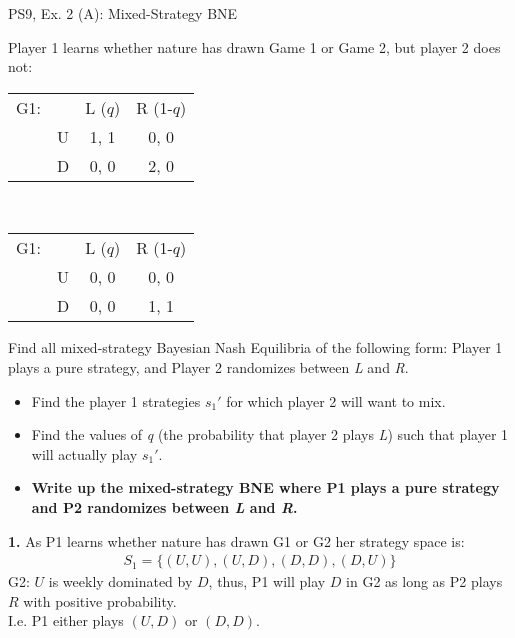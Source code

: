 \begin{frame}{PS9, Ex. 2 (A): Mixed-Strategy BNE}
    \begin{multicols}{2}
      Player 1 learns whether nature has drawn Game 1 or Game 2, but player 2 does not:
      \begin{table}
        \begin{tabular}{ll|c|c|}
          \multicolumn{1}{c}{G1:} & \multicolumn{1}{c}{} & \multicolumn{1}{c}{L ($q$)} & \multicolumn{1}{c}{R (1-$q$)} \\\cline{3-4}
          & U & 1, 1 & 0, 0 \\\cline{3-4}
          & D & 0, 0 & 2, 0 \\\cline{3-4}
        \end{tabular}\\\medskip
        \begin{tabular}{ll|c|c|}
          \multicolumn{1}{c}{G1:} & \multicolumn{1}{c}{} & \multicolumn{1}{c}{L ($q$)} & \multicolumn{1}{c}{R (1-$q$)} \\\cline{3-4}
          & U & 0, 0 & 0, 0 \\\cline{3-4}
          & D & 0, 0 & 1, 1 \\\cline{3-4}
        \end{tabular}
      \end{table}
      \vspace{-4pt}
      Find all mixed-strategy Bayesian Nash Equilibria of the following form: Player 1 plays a pure strategy, and Player 2 randomizes between \textit{L} and \textit{R}.
      \vspace{-4pt}
      \begin{itemize}
        \item[Step 1:] Find the player 1 strategies $s_1'$ for which player 2 will want to mix.
        \item[Step 2:] Find the values of \textit{q} (the probability that player 2 plays \textit{L}) such that player 1 will actually play $s_1'$.
        \item[Step 3:] \textbf{Write up the mixed-strategy BNE where P1 plays a pure strategy and P2 randomizes between \textit{L} and \textit{R}.}
      \end{itemize}
      \vfill\null\columnbreak
      \textbf{1.} As P1 learns whether nature has drawn G1 or G2 her strategy space is:
      \begin{align*}
        S_1=\{(U,U),(U,D),(D,D),(D,U)\}
      \end{align*}
      G2: $U$ is weekly dominated by $D$, thus, P1 will play $D$ in G2 as long as P2 plays $R$ with positive probability.\\\medskip I.e. P1 either plays $(U,D)$ or $(D,D)$.\\\medskip

\end{multicols}
\end{frame}
